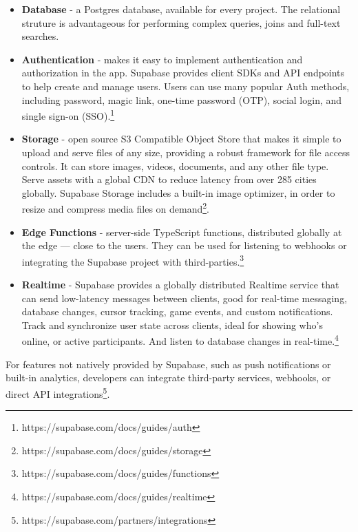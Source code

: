\begin{itemize}
	\item \textbf{Database} - a Postgres database, available for every project. The relational struture is advantageous for performing complex queries, joins and full-text searches\cite{ZewdieAyezabu2022}.
	\item \textbf{Authentication} - makes it easy to implement authentication and authorization in the app. Supabase provides client SDKs and API endpoints to help create and manage users. Users can use many popular Auth methods, including password, magic link, one-time password (OTP), social login, and single sign-on (SSO).\footnote{https://supabase.com/docs/guides/auth}
	\item \textbf{Storage} - open source S3 Compatible Object Store that makes it simple to upload and serve files of any size, providing a robust framework for file access controls. It can store images, videos, documents, and any other file type. Serve assets with a global CDN to reduce latency from over 285 cities globally. Supabase Storage includes a built-in image optimizer, in order to resize and compress media files on demand\footnote{https://supabase.com/docs/guides/storage}.
	\item \textbf{Edge Functions} - server-side TypeScript functions, distributed globally at the edge — close to the users. They can be used for listening to webhooks or integrating the Supabase project with third-parties.\footnote{https://supabase.com/docs/guides/functions}
	\item \textbf{Realtime} - Supabase provides a globally distributed Realtime service that can send low-latency messages between clients, good for real-time messaging, database changes, cursor tracking, game events, and custom notifications. Track and synchronize user state across clients, ideal for showing who's online, or active participants. And listen to database changes in real-time.\footnote{https://supabase.com/docs/guides/realtime}
\end{itemize}

For features not natively provided by Supabase, such as push notifications or built-in analytics, developers can integrate third-party services, webhooks, or direct API integrations\footnote{https://supabase.com/partners/integrations}.

